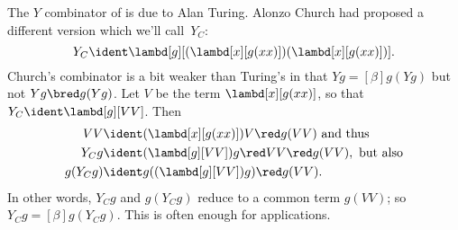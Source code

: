 \documentclass[../../../include/open-logic-section]{subfiles}
\begin{document}
The $Y$ combinator of  is due to Alan
Turing. Alonzo Church had proposed a different version which we'll
call~$Y_C$:
\[
Y_C \ident \lambd[g][(\lambd[x][g(xx)])(\lambd[x][g(xx)])].
\]
Church's combinator is a bit weaker than Turing's in that $Yg
\equal[\beta] g(Yg)$ but not $Yg \bred g(Yg)$. Let $V$ be the term
$\lambd[x][g(xx)]$, so that $Y_C \ident \lambd[g][VV]$. Then
\begin{align*}
  VV & \ident (\lambd[x][g(xx)])V \red g(VV)
  \text{ and thus}\\
  Y_C g & \ident (\lambd[g][VV])g \red VV \red g(VV), \text{ but also}\\
  g(Y_C g) & \ident g((\lambd[g][VV])g) \red g(VV).
\end{align*}
In other words, $Y_Cg$ and $g(Y_Cg)$ reduce to a common term $g(VV)$; so $Y_Cg
\equal[\beta] g(Y_Cg)$. This is often enough for applications.
\end{document}
